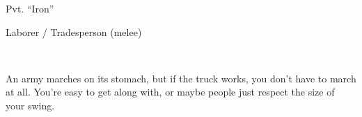 \documentclass{article}
\newcommand{\Bra}{3}
\newcommand{\Agi}{2}
\newcommand{\Int}{3}
\newcommand{\Cun}{2}
\newcommand{\Wil}{2}
\newcommand{\Pre}{3}
\begin{document}
\begin{minipage}{0.6\linewidth}
{\Huge Pvt. ``Iron'' }

    {\large Laborer / Tradesperson (melee)}

\vspace{1.5em}

\end{minipage}\hfill%
\\

\vspace{0em}\raggedright


An army marches on its stomach, but if the truck works, you don't have to march at all.  You're easy to get along with, or maybe people just respect the size of your swing.



\begin{center}
\Characteristics{\Bra}{\Agi}{\Int}{\Cun}{\Wil}{\Pre}

\noindent\null\hfill{}\quad
{}\null\quad
{}\quad
{}\hfill\null
{}\quad
\end{center}


\vspace{0.5em}



\vspace{-3em}
\end{document}
